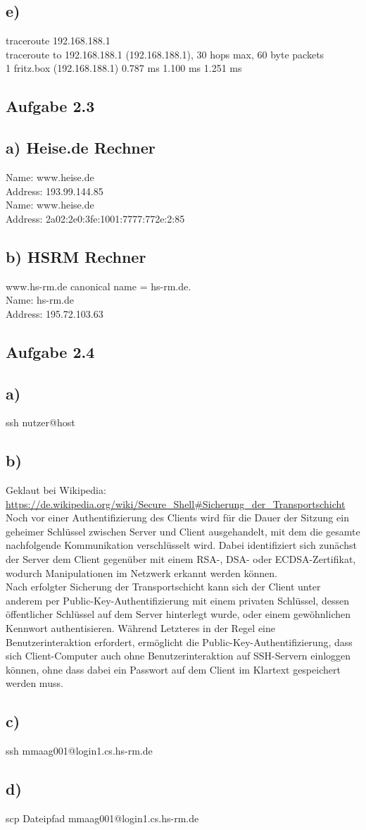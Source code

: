 \documentclass{article}
\begin{document}
	\subsection*{e)}
	traceroute 192.168.188.1 \\
	traceroute to 192.168.188.1 (192.168.188.1), 30 hops max, 60 byte packets \\
	1  fritz.box (192.168.188.1)  0.787 ms  1.100 ms  1.251 ms
	
	\subsection*{Aufgabe 2.3}
	\subsection*{a) Heise.de Rechner}
	Name:	www.heise.de \\
	Address: 193.99.144.85  \\
	Name:	www.heise.de \\
	Address: 2a02:2e0:3fe:1001:7777:772e:2:85
	
	\subsection*{b) HSRM Rechner}
	www.hs-rm.de	canonical name = hs-rm.de. \\
	Name:	hs-rm.de \\
	Address: 195.72.103.63
	
	\subsection*{Aufgabe 2.4}
	\subsection*{a)}
	ssh nutzer@host
	\subsection*{b)}
	Geklaut bei Wikipedia: \url{https://de.wikipedia.org/wiki/Secure_Shell#Sicherung_der_Transportschicht}  \\
	Noch vor einer Authentifizierung des Clients wird für die Dauer der Sitzung ein geheimer Schlüssel zwischen Server und Client ausgehandelt, mit dem die gesamte nachfolgende Kommunikation verschlüsselt wird. Dabei identifiziert sich zunächst der Server dem Client gegenüber mit einem RSA-, DSA- oder ECDSA-Zertifikat, wodurch Manipulationen im Netzwerk erkannt werden können. \\
	Nach erfolgter Sicherung der Transportschicht kann sich der Client unter anderem per Public-Key-Authentifizierung mit einem privaten Schlüssel, dessen öffentlicher Schlüssel auf dem Server hinterlegt wurde, oder einem gewöhnlichen Kennwort authentisieren. Während Letzteres in der Regel eine Benutzerinteraktion erfordert, ermöglicht die Public-Key-Authentifizierung, dass sich Client-Computer auch ohne Benutzerinteraktion auf SSH-Servern einloggen können, ohne dass dabei ein Passwort auf dem Client im Klartext gespeichert werden muss.
	\subsection*{c)}
	ssh mmaag001@login1.cs.hs-rm.de
	\subsection*{d)}
	scp Dateipfad mmaag001@login1.cs.hs-rm.de
\end{document}
